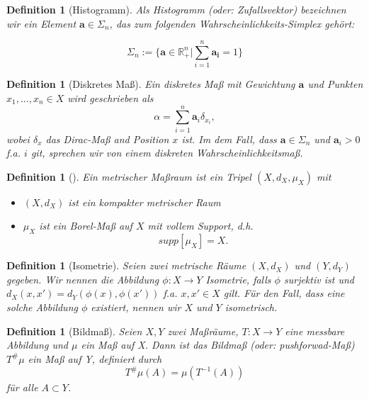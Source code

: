 \documentclass[11pt,a4paper]{article}
\def\emph#1{\textit{#1}}
\newtheorem{definition}[theorem]{Definition}
\numberwithin{equation}{section}
\begin{document}
	
	\begin{definition}[Histogramm]
		Als Histogramm (oder: Zufallsvektor) bezeichnen wir ein Element $\boldsymbol{a} \in \Sigma_n$, das zum folgenden Wahrscheinlichkeits-Simplex gehört:
		
		\begin{equation*}
		\Sigma_n := \lbrace \boldsymbol{a} \in \mathbb{R}_{+}^n | \sum_{i=1}^n{\boldsymbol{a_i} = 1} \rbrace
		\end{equation*}
	\end{definition}
	
	\begin{definition}[Diskretes Maß]
		Ein diskretes Maß mit Gewichtung $\boldsymbol{a}$ und Punkten $x_1,...,x_n \in X$ wird geschrieben als
		\begin{equation}
		\alpha = \sum_{i=1}^n{\boldsymbol{a}_i\delta_{x_i}},
		\end{equation}
		wobei $\delta_x$ das Dirac-Maß and Position $x$ ist. Im dem Fall, dass $\boldsymbol{a} \in \Sigma_n$ und $\boldsymbol{a}_i >0$ f.a. $i$ git, sprechen wir von einem diskreten Wahrscheinlichkeitsmaß.
	\end{definition}
	
	\begin{definition}[\cite{gromov2007metric}]
		Ein \emph{metrischer Maßraum} ist ein Tripel $(X,d_X,\mu_X)$ mit
		\begin{itemize}
			\item $(X, d_X)$ ist ein kompakter metrischer Raum
			\item $\mu_X$ ist ein Borel-Maß auf $X$ mit vollem Support, d.h. 
			\begin{equation}
			supp[\mu_X] = X.\label{eq:bed_mmspaces}
			\end{equation} 
		\end{itemize}
	\end{definition}
	
	\begin{definition}[Isometrie]
		Seien zwei metrische Räume $(X, d_X)$ und $(Y,d_Y)$ gegeben. Wir nennen die Abbildung $\phi:X \to Y$ Isometrie, falls $\phi$ surjektiv ist und $d_X(x,x')= d_Y(\phi(x),\phi(x'))$ f.a. $x, x' \in X$ gilt. Für den Fall, dass eine solche Abbildung $\phi$ existiert, nennen wir $X$ und $Y$ isometrisch.
	\end{definition}

	\begin{definition}[Bildmaß]
		Seien $X,Y$ zwei Maßräume, $T: X \to Y$ eine messbare Abbildung und $\mu$ ein Maß auf X. Dann ist das Bildmaß (oder: pushforwad-Maß) $T^\# \mu $ ein Maß auf Y, definiert durch \begin{equation}
		T^\# \mu (A) = \mu (T^{-1}(A))
		\end{equation}
		für alle $A \subset Y$.
	\end{definition}
\end{document}
